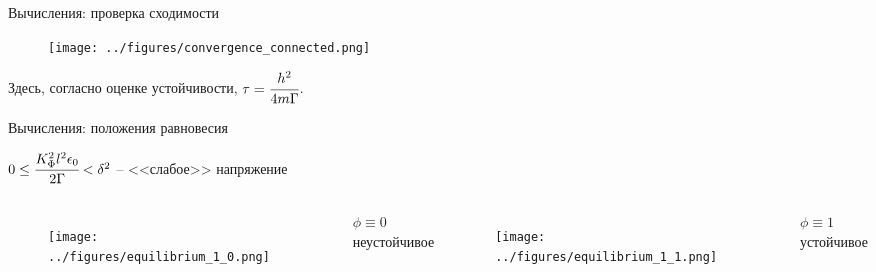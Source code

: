 \documentclass{beamer}
\begin{document}
\begin{frame}{Вычисления: проверка сходимости}
\vspace{-0.2cm}
\begin{figure}
	\texttt{[image: ../figures/convergence\_connected.png]}
\end{figure}
\vspace{-0.7cm}
\begin{center}
	Здесь, согласно оценке устойчивости, $\tau = \cfrac{h^2}{4m \Gamma}$.
\end{center}
\end{frame}


\begin{frame}{Вычисления: положения равновесия}
\begin{center}
	$0 \leq \cfrac{K_\Phi^2 l^2 \epsilon_0}{2 \Gamma} < \delta^2$ -- <<слабое>> напряжение
\end{center}
\begin{columns}
\begin{figure}
	\texttt{[image: ../figures/equilibrium\_1\_0.png]}
\end{figure}
\begin{center}
	$\phi \equiv 0$ \\
	неустойчивое
\end{center}
\begin{figure}
	\texttt{[image: ../figures/equilibrium\_1\_1.png]}
\end{figure}
\begin{center}
	$\phi \equiv 1$ \\
	устойчивое
\end{center}
\end{columns}
\end{frame}
\end{document}
